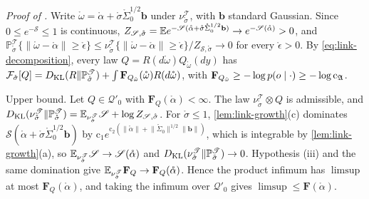 \noindent\emph{Proof of .}
Write $\mathring\omega=\mathring\alpha+\mathring\sigma\mathring\Sigma_0^{1/2}\mathbf b$
under $\nu^{\mathscr T}_{\mathring\sigma}$, with $\mathbf b$ standard Gaussian. Since $0\leq e^{-\mathscr S}\leq1$ is
continuous, $Z_{\mathscr S,\mathring\sigma}=\mathbb E e^{-\mathscr S(\mathring\alpha+\mathring\sigma\mathring\Sigma_0^{1/2}\mathbf b)}\to e^{-\mathscr S(\mathring\alpha)}>0$,
and
$\mathbb P^{\mathscr T}_{\mathring\sigma}\{\lVert\mathring\omega-\mathring\alpha\rVert\geq\mathring\epsilon\}\leq\nu^{\mathscr T}_{\mathring\sigma}\{\lVert\mathring\omega-\mathring\alpha\rVert\geq\mathring\epsilon\}/Z_{\mathscr S,\mathring\sigma}\to0$
for every $\mathring\epsilon>0$. By \eqref{eq:link-decomposition}, every law $Q=R(d\mathring\omega)Q_{\mathring\omega}(dy)$ has
$\mathcal F_{\mathring\sigma}[Q]=D_{\mathrm{KL}}(R\Vert\mathbb P^{\mathscr T}_{\mathring\sigma})+\int\mathbf F_{Q_{\mathring\omega}}(\mathring\omega)R(d\mathring\omega)$, with
$\mathbf F_{Q_{\mathring\omega}}\geq-\log p(o\mid\cdot)\geq-\log\mathrm c_{\mathfrak A}$.

Upper bound. Let $Q\in\mathcal Q'_0$ with $\mathbf F_Q(\mathring\alpha)<\infty$. The law
$\nu^{\mathscr T}_{\mathring\sigma}\otimes Q$ is admissible, and
$D_{\mathrm{KL}}(\nu^{\mathscr T}_{\mathring\sigma}\Vert\mathbb P^{\mathscr T}_{\mathring\sigma})=\mathbb E_{\nu^{\mathscr T}_{\mathring\sigma}}\mathscr S+\log Z_{\mathscr S,\mathring\sigma}$.
For $\mathring\sigma\leq1$, \cref{lem:link-growth}(c) dominates
$\mathscr S(\mathring\alpha+\mathring\sigma\mathring\Sigma_0^{1/2}\mathbf b)$ by
$\mathrm c_1e^{\mathrm c_2(\lVert\mathring\alpha\rVert+\lVert\mathring\Sigma_0\rVert^{1/2}\lVert\mathbf b\rVert)}$, which is integrable by
\cref{lem:link-growth}(a), so $\mathbb E_{\nu^{\mathscr T}_{\mathring\sigma}}\mathscr S\to\mathscr S(\mathring\alpha)$ and
$D_{\mathrm{KL}}(\nu^{\mathscr T}_{\mathring\sigma}\Vert\mathbb P^{\mathscr T}_{\mathring\sigma})\to0$. Hypothesis (iii) and the same domination
give $\mathbb E_{\nu^{\mathscr T}_{\mathring\sigma}}\mathbf F_Q\to\mathbf F_Q(\mathring\alpha)$. Hence the product infimum has
$\limsup$ at most $\mathbf F_Q(\mathring\alpha)$, and taking the infimum over $\mathcal Q'_0$ gives
$\limsup\leq\mathbf F(\mathring\alpha)$.

